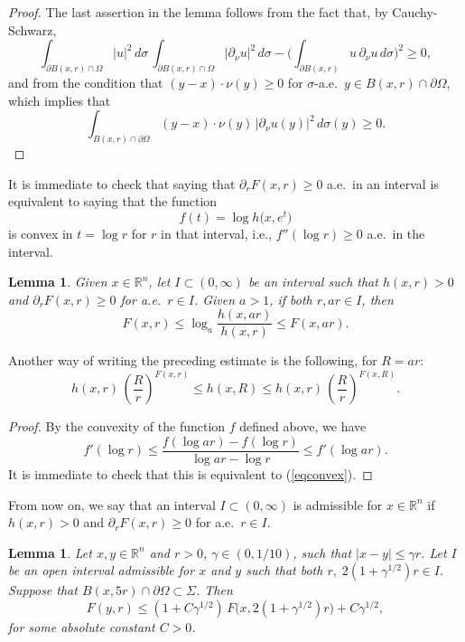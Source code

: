 \documentclass[11pt]{amsart}
\newcommand{\R}{{\mathbb R}}       %
\newcommand{\rf}[1]{{(\ref{#1})}}
\newcommand{\vv}{{\vspace{2mm}}}
\newtheorem{lemma}[theorem]{Lemma}
\theoremstyle{definition}
\theoremstyle{remark}
\numberwithin{equation}{section}
\begin{document}
\begin{proof}
The last assertion in the lemma follows from the fact that, by Cauchy-Schwarz,
$$\int_{\partial B(x,r)\cap\Omega} |u|^2\,d\sigma\,
 \int_{\partial B(x,r)\cap\Omega} \big|\partial_\nu u\big|^2\,d\sigma - \bigg(\int_{\partial B(x,r)} u\,\partial_\nu u\,d\sigma\bigg)^2\geq0,$$
and from
the condition that $(y-x)\cdot \nu(y)\geq 0$ for $\sigma$-a.e.\ $y\in B(x,r)\cap\partial\Omega$, which implies that
$$\int_{B(x,r)\cap\partial\Omega} (y-x)\cdot \nu(y)\,\big|\partial_\nu u(y)\big|^2\,d\sigma(y)\geq0.$$
\end{proof}


\vv
It is immediate to check that saying that $\partial_r F(x,r)\geq0$ a.e.\ in an interval is equivalent to saying that the function
$$f(t) = \log h\big(x,e^t\big)$$
is convex in $t=\log r$ for $r$ in that interval, i.e., $f''(\log r)\geq0$ a.e.\ in the interval.
\vv

\begin{lemma}\label{lemconvex}
Given $x\in \R^{n}$,
let $I\subset (0,\infty)$ be an interval such that $h(x,r)>0$ and $\partial_r F(x,r)\geq0$ for a.e.\ $r\in I$.
Given $a>1$, if both $r,ar\in I$, then
\begin{equation}\label{eqconvex}
F(x,r)\leq \log_a \frac{h(x,ar)}{h(x,r)}\leq F(x,ar).
\end{equation}
\end{lemma}

Another way of writing the preceding estimate is the following, for $R=ar$:
\begin{equation}\label{eqconvex2}
h(x,r)\,\left(\frac Rr\right)^{F(x,r)}\leq h(x,R)\leq h(x,r)\,\left(\frac Rr\right)^{F(x,R)}.
\end{equation}
\vv

\begin{proof}
By the convexity of the function $f$ defined above, we have
$$f'(\log r)\leq \frac{f(\log ar) - f(\log r)}{\log ar - \log r} \leq f'(\log ar).$$
It is immediate to check that this is equivalent to \rf{eqconvex}.
\end{proof}
\vv

From now on, we say that an interval  $I\subset (0,\infty)$ is admissible for $x\in\R^{n}$ if $h(x,r)>0$ and $\partial_r F(x,r)\geq0$ for a.e.\ $r\in I$.
\vv

\begin{lemma}\label{lemperturb}
Let $x,y\in\R^{n}$ and $r>0$, $\gamma\in(0,1/10)$, such that $|x-y|\leq\gamma r$. 
Let $I$ be an open interval admissible for $x$ and $y$ such that both $r,\;2(1+\gamma^{1/2})r\in I$.
Suppose that $B(x,5r)\cap\partial\Omega\subset\Sigma$.
Then
\begin{equation}\label{eqpp4}
F(y,r) \leq (1+C\gamma^{1/2}) \,F\big(x, 2(1+\gamma^{1/2})r\big) + C\gamma^{1/2},
\end{equation}
for some absolute constant $C>0$.
\end{lemma}
\end{document}
